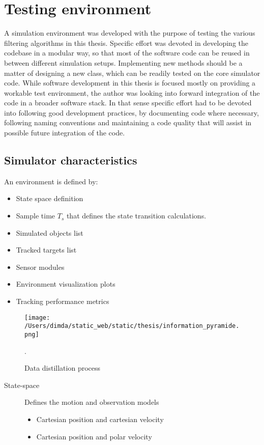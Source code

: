 
\chapter{Testing environment }

A simulation environment was developed with the purpose of testing the various filtering algorithms in this thesis. Specific effort was devoted in developing the codebase in a modular way, so that most of the software code can be reused in between different simulation setups. Implementing new methods should be a matter of designing a new class, which can be readily tested on the core simulator code. While software development in this thesis is focused mostly on providing a workable test environment, the author was looking into forward integration of the code in a broader software stack. In that sense specific effort had to be devoted into following good development practices, by documenting code where necessary, following naming conventions and maintaining a code quality that will assist in possible future integration of the code.


\section{Simulator characteristics}

An environment is defined by:
\begin{itemize}
	\item State space definition 
	\item Sample time $T_s$ that defines the state transition calculations.
	\item Simulated objects list
	\item Tracked targets list
	\item Sensor modules
	\item Environment visualization plots
	\item Tracking performance metrics
\end{itemize}


\begin{figure}[H]
	\centering
	\texttt{[image: /Users/dimda/static\_web/static/thesis/information\_pyramide.png]}
	\caption{Data distillation process}.
	\label{fig:information_pyramide}
\end{figure}


\begin{description}
	\item[State-space] Defines the motion and observation models
	\begin{itemize}
		\item Cartesian position and cartesian velocity
		\item Cartesian position and polar velocity
	\end{itemize}
\end{description}


